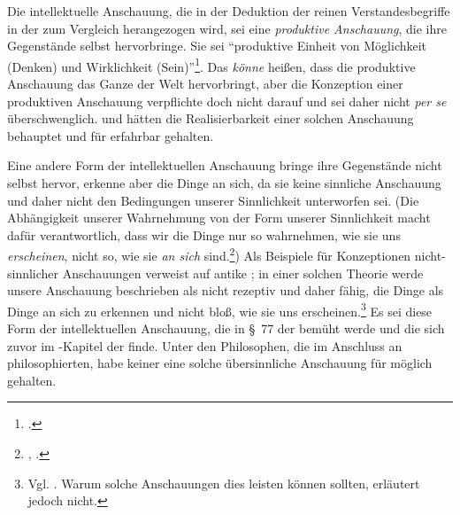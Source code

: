 \begin{nummerierung}
  \item Die intellektuelle Anschauung, die in der Deduktion der reinen
  Verstandesbegriffe in der  zum Vergleich
  herangezogen wird, sei eine \emph{produktive Anschauung}, die ihre
  Gegenstände selbst hervorbringe. Sie sei \enquote{produktive Einheit von
  Möglichkeit (Denken) und Wirklichkeit
  (Sein)}\footcite[][179]{Foerster:DieBedeutungvonSS7677deremphKritikderUrteilskraftfuerdieEntwicklungdernachkantischenPhilosophieTeil12002}.
  Das \emph{könne} heißen, dass die produktive Anschauung das Ganze der Welt
  hervorbringt, aber die Konzeption einer produktiven Anschauung verpflichte
  doch nicht darauf und sei daher nicht \emph{per se} überschwenglich.
   und
   hätten die
  Realisierbarkeit einer solchen Anschauung behauptet und für erfahrbar
  gehalten.
  \item Eine andere Form der intellektuellen Anschauung bringe ihre
  Gegenstände nicht selbst hervor, erkenne aber die Dinge an sich, da sie keine
  sinnliche Anschauung und daher nicht den Bedingungen unserer Sinnlichkeit
  unterworfen sei. (Die Abhängigkeit unserer Wahrnehmung von der Form unserer
  Sinnlichkeit macht  dafür verantwortlich, dass wir die
  Dinge nur so wahrnehmen, wie sie uns \emph{erscheinen}, nicht so, wie sie
  \emph{an sich} sind.\footnote{\cite[Vgl.][B 59]{Kant:KritikderreinenVernunft2003},
  \cite[][III: 65.9--22]{Kant:GesammelteWerke1900ff.}.}) Als Beispiele für
  Konzeptionen nicht-sinnlicher Anschauungen verweist
   auf antike
  ; in einer solchen Theorie werde unsere
  Anschauung beschrieben als nicht rezeptiv und daher fähig, die Dinge als Dinge
  an sich zu erkennen und nicht bloß, wie sie uns erscheinen.\footnote{Vgl.
  \cite[][178]{Foerster:DieBedeutungvonSS7677deremphKritikderUrteilskraftfuerdieEntwicklungdernachkantischenPhilosophieTeil12002}.
  Warum solche Anschauungen dies leisten können sollten, erläutert
   jedoch nicht.} Es sei diese
  Form der intellektuellen Anschauung, die in \S~77 der  bemüht werde und die sich zuvor im
  -Kapitel der 
  finde. Unter den Philosophen, die im Anschluss an 
  philosophierten, habe keiner eine solche übersinnliche Anschauung für möglich
  gehalten.
\end{nummerierung}
